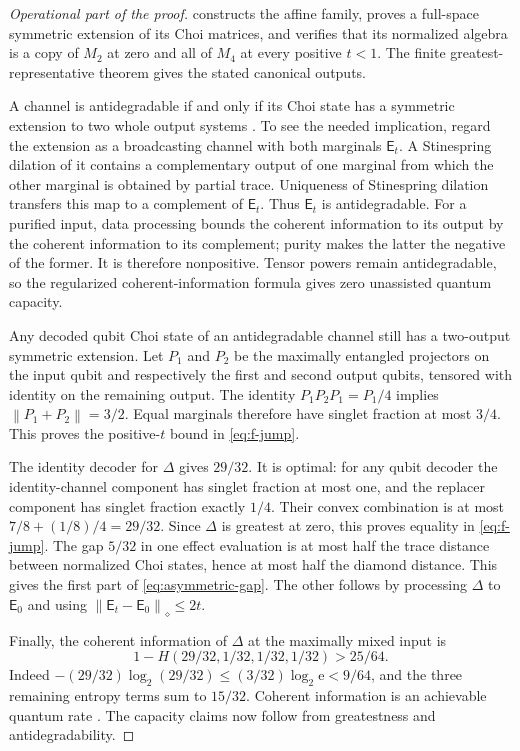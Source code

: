 \documentclass[11pt,reqno]{amsart}
\theoremstyle{definition}
\theoremstyle{remark}
\numberwithin{equation}{section}
\newcommand{\E}{\mathsf E}
\newcommand{\norm}[1]{\left\lVert#1\right\rVert}
\newcommand{\ee}{\mathrm e}
\begin{document}
\begin{proof}[Operational part of the proof]
 constructs the affine family, proves a full-space symmetric extension of its Choi matrices, and verifies that its normalized algebra is a copy of $M_2$ at zero and all of $M_4$ at every positive $t<1$. The finite greatest-representative theorem gives the stated canonical outputs.

A channel is antidegradable if and only if its Choi state has a symmetric extension to two whole output systems \cite[Lemma~5]{MyhrLutkenhaus}. To see the needed implication, regard the extension as a broadcasting channel with both marginals $\E_t$. A Stinespring dilation of it contains a complementary output of one marginal from which the other marginal is obtained by partial trace. Uniqueness of Stinespring dilation transfers this map to a complement of $\E_t$. Thus $\E_t$ is antidegradable. For a purified input, data processing bounds the coherent information to its output by the coherent information to its complement; purity makes the latter the negative of the former. It is therefore nonpositive. Tensor powers remain antidegradable, so the regularized coherent-information formula \cite{Devetak} gives zero unassisted quantum capacity.

Any decoded qubit Choi state of an antidegradable channel still has a two-output symmetric extension. Let $P_1$ and $P_2$ be the maximally entangled projectors on the input qubit and respectively the first and second output qubits, tensored with identity on the remaining output. The identity $P_1P_2P_1=P_1/4$ implies $\norm{P_1+P_2}=3/2$. Equal marginals therefore have singlet fraction at most $3/4$. This proves the positive-$t$ bound in \eqref{eq:f-jump}.

The identity decoder for $\Delta$ gives $29/32$. It is optimal: for any qubit decoder the identity-channel component has singlet fraction at most one, and the replacer component has singlet fraction exactly $1/4$. Their convex combination is at most $7/8+(1/8)/4=29/32$. Since $\Delta$ is greatest at zero, this proves equality in \eqref{eq:f-jump}. The gap $5/32$ in one effect evaluation is at most half the trace distance between normalized Choi states, hence at most half the diamond distance. This gives the first part of \eqref{eq:asymmetric-gap}. The other follows by processing $\Delta$ to $\E_0$ and using $\norm{\E_t-\E_0}_\diamond\le2t$.

Finally, the coherent information of $\Delta$ at the maximally mixed input is
\[
 1-H(29/32,1/32,1/32,1/32)>25/64.
\]
Indeed $-(29/32)\log_2(29/32)\le(3/32)\log_2\ee<9/64$, and the three remaining entropy terms sum to $15/32$. Coherent information is an achievable quantum rate \cite[Theorem~5 and Proposition~7]{Devetak}. The capacity claims now follow from greatestness and antidegradability.
\end{proof}
\end{document}
